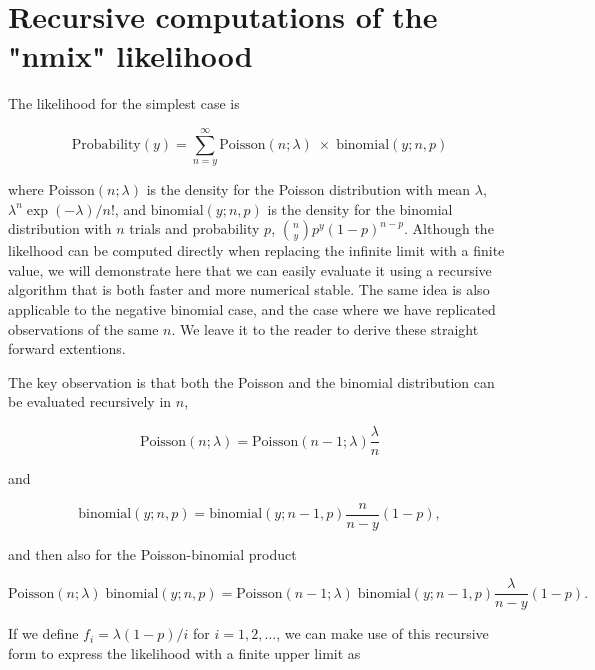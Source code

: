 \documentclass[article]{jss}
\begin{document}
\section{Recursive computations of the "nmix" likelihood}
The likelihood for the simplest case is

\begin{displaymath}
    \text{Probability}(y) = \sum_{n = y}^{\infty}
    \text{Poisson}(n ; \lambda) \;\times\; \text{binomial}(y;  n, p)
\end{displaymath}

where $\text{Poisson}(n; \lambda)$ is the density for the Poisson distribution with mean $\lambda$, $\lambda^{n}\exp(-\lambda)/n!$, and $\text{binomial}(y; n, p)$ is the density for the binomial distribution
with $n$ trials and probability $p$, ${n \choose y} p^{y}(1-p)^{n-p}$. Although the likelhood can be computed directly when replacing the infinite limit with a finite value, we will demonstrate here that we
can easily evaluate it using a recursive algorithm that is both faster and more numerical stable. The same idea is also applicable to the negative binomial case, and the case where we have replicated observations of the same $n$. We leave it to the reader to derive these straight forward extentions.

The key observation is that both the Poisson and the binomial distribution can be evaluated recursively in $n$,

\begin{displaymath}
    \text{Poisson}(n; \lambda) = \text{Poisson}(n-1; \lambda) \frac{\lambda}{n}
\end{displaymath}

and

\begin{displaymath}
    \text{binomial}(y; n, p) = \text{binomial}(y; n-1, p) \frac{n}{n-y}(1-p),
\end{displaymath}

and then also for the Poisson-binomial product

\begin{displaymath}
    \text{Poisson}(n ; \lambda) \; \text{binomial}(y;  n, p)
    =
    \text{Poisson}(n-1; \lambda) \; \text{binomial}(y; n-1, p)
    \frac{\lambda}{n-y}(1-p).
\end{displaymath}

If we define $f_i = \lambda(1-p)/i$ for $i=1, 2, \ldots$, we can make use of this recursive form to express the likelihood with a finite upper limit as
\end{document}
